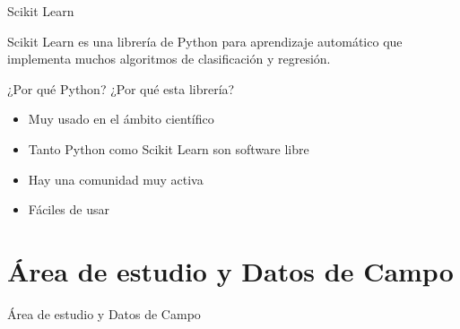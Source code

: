 \documentclass[10pt]{beamer}
\begin{document}
\begin{frame}{Scikit Learn}

  Scikit Learn es una librería de Python para aprendizaje automático que
  implementa muchos algoritmos de clasificación y regresión.

  ¿Por qué Python? ¿Por qué esta librería?

  \begin{itemize}
  \item Muy usado en el ámbito científico
  \item Tanto Python como Scikit Learn son software libre
  \item Hay una comunidad muy activa
  \item Fáciles de usar
  \end{itemize}


\end{frame}


\section{Área de estudio y Datos de Campo}

\begin{frame}{Área de estudio y Datos de Campo}



\end{frame}
\end{document}
